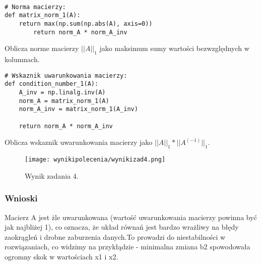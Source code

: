\documentclass{article}
\begin{document}
\begin{lstlisting}
    
# Norma macierzy:
def matrix_norm_1(A):
    return max(np.sum(np.abs(A), axis=0))  
        return norm_A * norm_A_inv
\end{lstlisting}
    Oblicza norme macierzy $||A||_1$ jako maksimum sumy wartości bezwzględnych w kolumnach.
\begin{lstlisting}
# Wskaznik uwarunkowania macierzy:
def condition_number_1(A):
    A_inv = np.linalg.inv(A)  
    norm_A = matrix_norm_1(A)  
    norm_A_inv = matrix_norm_1(A_inv)  

    return norm_A * norm_A_inv
\end{lstlisting}

Oblicza wskaznik uwarunkowania macierzy jako $||A||_1 * ||A^{(-1)}||_1$.

\begin{figure}[h]
    \centering
    \texttt{[image: wynikipolecenia/wynikizad4.png]}
    \caption{Wynik zadania 4.}
    \label{zad4wyniki}
\end{figure}

\subsubsection{Wnioski}
Macierz A jest żle uwarunkowana (wartość uwarunkowania macierzy powinna być jak najbliżej 1), co oznacza, że układ równań jest bardzo wrażliwy na błędy zaokrągleń i drobne zaburzenia danych.To prowadzi do niestabilności w rozwiązaniach, co widzimy na przykłądzie - minimalna zmiana b2 spowodowała ogromny skok w wartościach x1 i x2.
\end{document}
